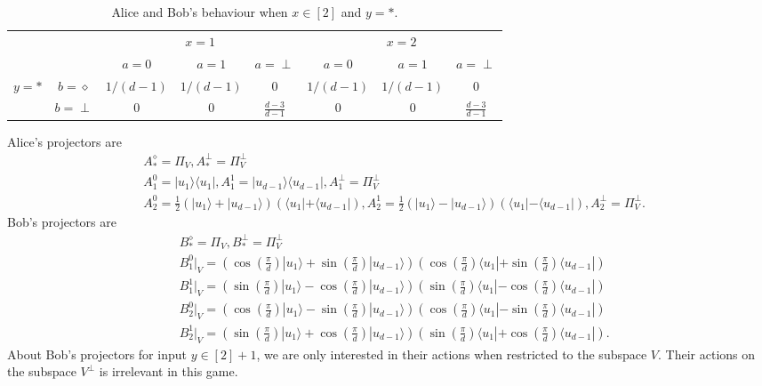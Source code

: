 \documentclass[11pt,letterpaper]{article}
\newcommand{\ket}[1]{|#1\rangle}
\newcommand{\bra}[1]{\langle#1|}
\newcommand{\ketbra}[2]{|#1\rangle\langle#2|}
\newcommand{\1}{\mathbb{1}}
\theoremstyle{definition}
\begin{document}
\begin{table}[H]
\begin{center}
\begin{tabular}{|c|c||c|c|c|c|c|c|}
\hline
\multicolumn{2}{|c|}{} &
\multicolumn{3}{|c|}{$x=1$}&
\multicolumn{3}{|c|}{$x=2$} \\
\cline{3-8}
\multicolumn{2}{|c|}{} &
$a = 0$ & $a=1$ & $a=\perp$ &
$a = 0$ & $a=1$ & $a=\perp$\\
\hline
\hline
\multirow{2}{*}{$y = \ast$} & $b=\diamond$ & $1/(d-1)$ & $1/(d-1)$ & 0 
& $1/(d-1)$ & $1/(d-1)$ & 0 \\
\cline{2-8}
&$b=\perp$ & 0 & 0 & $\frac{d-3}{d-1}$ 
&  0 & 0 & \small $\frac{d-3}{d-1} $  \\
\hline
\end{tabular}
\end{center}
\caption{Alice and Bob's behaviour when $x\in [2]$ and $y = \ast$.}
\end{table}
Alice's projectors are 
\begin{align*}
	&A_\ast^\diamond = \Pi_V, A_\ast^\perp = \Pi_V^\perp \\
	&A_1^0 = \ketbra{u_1}{u_1}, A_1^1 = \ketbra{u_{d-1}}{u_{d-1}}, A_1^\perp = \Pi_V^\perp\\
	&A_2^0 = \frac{1}{2}(\ket{u_1}+\ket{u_{d-1}})(\bra{u_1}+\bra{u_{d-1}}), 
	A_2^1 = \frac{1}{2}(\ket{u_1}-\ket{u_{d-1}})(\bra{u_1}-\bra{u_{d-1}}),A_2^\perp = \Pi_V^\perp.
\end{align*}
Bob's projectors are 
\begin{align*}
	&B_\ast^\diamond = \Pi_V, B_\ast^\perp = \Pi_V^\perp \\
	&B_1^0|_V = \left( \cos(\frac{\pi}{d})\ket{u_1} + \sin(\frac{\pi}{d})\ket{u_{d-1}}\right)
	\left( \cos(\frac{\pi}{d})\bra{u_1} + \sin(\frac{\pi}{d})\bra{u_{d-1}}\right)\\
	&B_1^1|_V = \left( \sin(\frac{\pi}{d})\ket{u_1} - \cos(\frac{\pi}{d})\ket{u_{d-1}}\right)
	\left( \sin(\frac{\pi}{d})\bra{u_1} - \cos(\frac{\pi}{d})\bra{u_{d-1}}\right)\\
	&B_2^0|_V = \left( \cos(\frac{\pi}{d})\ket{u_1} - \sin(\frac{\pi}{d})\ket{u_{d-1}}\right)
	\left( \cos(\frac{\pi}{d})\bra{u_1} - \sin(\frac{\pi}{d})\bra{u_{d-1}}\right)\\
	&B_2^1|_V = \left( \sin(\frac{\pi}{d})\ket{u_1} + \cos(\frac{\pi}{d})\ket{u_{d-1}}\right)
	\left( \sin(\frac{\pi}{d})\bra{u_1} + \cos(\frac{\pi}{d})\bra{u_{d-1}}\right).
\end{align*}
About Bob's projectors for input $y \in [2]+1$, we are only interested in their actions when restricted 
to the subspace $V$. Their actions on the subspace $V^\perp$ is irrelevant in this game.
\end{document}
